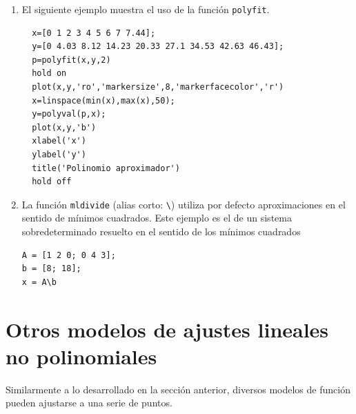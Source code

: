 \documentclass[letterpaper,11pt]{article}
\begin{document}
\begin{enumerate}

\item El siguiente ejemplo muestra el uso de la funci\'on \texttt{polyfit}.
\begin{lstlisting}
  x=[0 1 2 3 4 5 6 7 7.44];
  y=[0 4.03 8.12 14.23 20.33 27.1 34.53 42.63 46.43];
  p=polyfit(x,y,2)
  hold on
  plot(x,y,'ro','markersize',8,'markerfacecolor','r')
  x=linspace(min(x),max(x),50);
  y=polyval(p,x);
  plot(x,y,'b')
  xlabel('x')
  ylabel('y')
  title('Polinomio aproximador')
  hold off
\end{lstlisting}
    
    \item La funci\'on \texttt{mldivide} (alias corto: \texttt{\textbackslash}) utiliza por defecto aproximaciones en el sentido de m\'inimos cuadrados. Este ejemplo es el de un sistema sobredeterminado resuelto en el sentido de los m\'inimos cuadrados
    \begin{lstlisting}
A = [1 2 0; 0 4 3];
b = [8; 18];
x = A\b
    \end{lstlisting}
    
\end{enumerate}

\section{Otros modelos de ajustes lineales no polinomiales}
Similarmente a lo desarrollado en la secci\'on anterior, diversos modelos de funci\'on pueden ajustarse a una serie de puntos.
\end{document}
